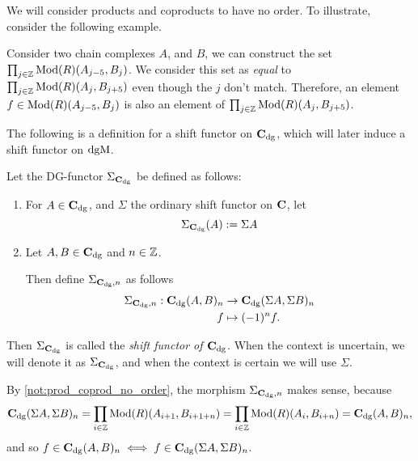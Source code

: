 \begin{notation}
    \label{not:prod_coprod_no_order}
    We will consider products and coproducts to have no order. To illustrate, consider the following example.

    Consider two chain complexes \( A \), and \( B \), we can construct the set \( \prod_{j \in {\mathbb{Z}}} \operatorname{Mod}(R)(A_{j - 5}, B_j) \). We consider this set as \emph{equal} to \( \prod_{j \in {\mathbb{Z}}} \operatorname{Mod}(R)(A_j, B_{j + 5}) \) even though the \( j \) don't match. Therefore, an element \( f \in \operatorname{Mod}(R)(A_{j - 5}, B_j) \) is also an element of \( \prod_{j \in {\mathbb{Z}}} \operatorname{Mod}(R)(A_j, B_{j + 5}) \).
\end{notation}

The following is a definition for a shift functor on \( \C_{\dg} \), which will later induce a shift functor on \( \operatorname{dgM} \).

\begin{definition}[Shift in \( \C_{\dg} \)]
    \label{def:sigma_c_dg}
    Let the DG-functor \( \Sigma_{\operatorname{\mathbf{C}}_{\operatorname{dg}}} \) be defined as follows:
    \begin{enumerate}
        \item {
            For \( A \in \operatorname{\mathbf{C}}_{\operatorname{dg}} \), and \( \Sigma \) the ordinary shift functor on \( \operatorname{\mathbf{C}} \), let
            \[
                \Sigma_{\operatorname{\mathbf{C}}_{\operatorname{dg}}}(A) := \Sigma A
            \]
        }
        \item {
            Let \( A, B \in \operatorname{\mathbf{C}}_{\operatorname{dg}} \) and \( n \in {\mathbb{Z}} \).

            Then define \( \Sigma_{\operatorname{\mathbf{C}}_{\operatorname{dg}}, n} \) as follows
            \begin{align*}
                \Sigma_{\operatorname{\mathbf{C}}_{\operatorname{dg}}, n}: \operatorname{\mathbf{C}}_{\operatorname{dg}}(A, B)_n &\to \operatorname{\mathbf{C}}_{\operatorname{dg}}(\Sigma A, \Sigma B)_n \\
                f &\mapsto (-1)^n f.
            \end{align*}
        }
    \end{enumerate}
    Then \( \Sigma_{\operatorname{\mathbf{C}}_{\operatorname{dg}}} \) is called the \emph{shift functor of \( \C_{\dg} \)}. When the context is uncertain, we will denote it as \( \Sigma_{\operatorname{\mathbf{C}}_{\operatorname{dg}}} \), and when the context is certain we will use \( \Sigma \).
\end{definition}

By \autoref{not:prod_coprod_no_order}, the morphism \( \Sigma_{\operatorname{\mathbf{C}}_{\operatorname{dg}}, n} \) makes sense, because
\[
    \operatorname{\mathbf{C}}_{\operatorname{dg}}(\Sigma A, \Sigma B)_n  = \prod_{i \in {\mathbb{Z}}} \operatorname{Mod}(R)(A_{i + 1}, B_{i + 1 + n}) = \prod_{i \in {\mathbb{Z}}} \operatorname{Mod}(R)(A_i, B_{i + n}) = \operatorname{\mathbf{C}}_{\operatorname{dg}}(A, B)_n,
\]
and so \( f \in \operatorname{\mathbf{C}}_{\operatorname{dg}}(A, B)_n \iff f \in \operatorname{\mathbf{C}}_{\operatorname{dg}}(\Sigma A, \Sigma B)_n \).

